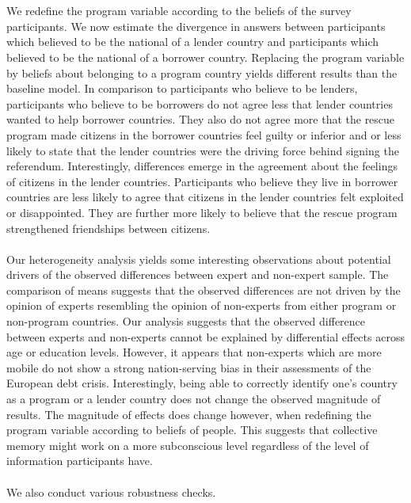 \\\\
We redefine the program variable according to the beliefs of the survey participants. We now estimate the divergence in answers between participants which believed to be the national of a  lender country and participants which believed to be the national of a borrower country. Replacing the program variable by beliefs about belonging to a program country yields different results than the baseline model. In comparison to participants who believe to be lenders, participants who believe to be borrowers do not agree less that lender countries wanted to help borrower countries. They also do not agree more that the rescue program made citizens in the borrower countries feel guilty or inferior and or less likely to state that the lender countries were the driving force behind signing the referendum. Interestingly, differences emerge in the agreement about the feelings of citizens in the lender countries. Participants who believe they live in borrower countries are less likely to agree that citizens in the lender countries felt exploited or disappointed. They are further more likely to believe that the rescue program strengthened friendships between citizens. \\

\\
Our heterogeneity analysis yields some interesting observations about potential drivers of the observed differences between expert and non-expert sample. The comparison of means suggests that the observed differences are not driven by the opinion of experts resembling the opinion of non-experts from either program or non-program countries. 
Our analysis suggests that the observed difference between experts and non-experts cannot be explained by differential effects across age or education levels. However, it appears that non-experts which are more mobile do not show a strong nation-serving bias in their assessments of the European debt crisis. Interestingly, being able to correctly identify one's country as a program or a lender country does not change the observed magnitude of results. The magnitude of effects does change however, when redefining the program variable according to beliefs of people. This suggests that collective memory might work on a more subconscious level regardless of the level of information participants have. 
\\
\\
We also conduct various robustness checks. \\

